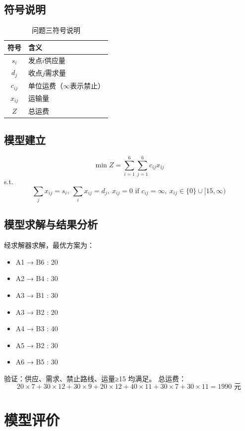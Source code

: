 \documentclass[12pt]{ctexart}
\begin{document}
\subsection{符号说明}
\begin{table}[htbp]
    \centering
    \caption{问题三符号说明}
    \begin{tabular}{cl}
        \toprule
        符号 & 含义 \\
        \midrule
        $s_i$ & 发点$i$供应量 \\
        $d_j$ & 收点$j$需求量 \\
        $c_{ij}$ & 单位运费（$\infty$表示禁止）\\
        $x_{ij}$ & 运输量 \\
        $Z$ & 总运费 \\
        \bottomrule
    \end{tabular}
\end{table}

\subsection{模型建立}
\[
\min Z = \sum_{i=1}^{6}\sum_{j=1}^{6} c_{ij}x_{ij}
\]
s.t.
\[
\sum_{j} x_{ij} = s_i,\ 
\sum_{i} x_{ij} = d_j,\ 
x_{ij} = 0 \text{ if } c_{ij} = \infty,\ 
x_{ij} \in \{0\} \cup [15, \infty)
\]

\subsection{模型求解与结果分析}
经求解器求解，最优方案为：
\begin{itemize}
    \item A1 → B6 : 20
    \item A2 → B4 : 30
    \item A3 → B1 : 30
    \item A3 → B2 : 20
    \item A4 → B3 : 40
    \item A5 → B2 : 30
    \item A6 → B5 : 30
\end{itemize}
验证：供应、需求、禁止路线、运量≥15 均满足。  
总运费：
\[
20\!\times\!7 + 30\!\times\!12 + 30\!\times\!9 + 20\!\times\!12 + 40\!\times\!11 + 30\!\times\!7 + 30\!\times\!11 = 1990 \text{ 元}
\]

\section{模型评价}
\end{document}
